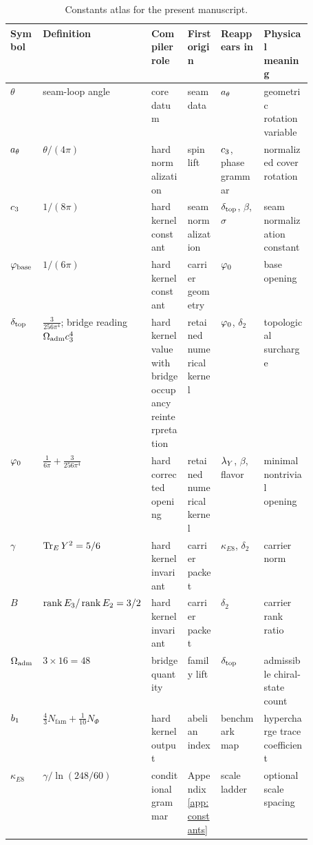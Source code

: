 \begin{table}[t]
\centering
\scriptsize
\setlength{\tabcolsep}{3pt}
\begin{tabularx}{\linewidth}{@{}>{\raggedright\arraybackslash}p{0.10\linewidth}>{\raggedright\arraybackslash}p{0.18\linewidth}>{\raggedright\arraybackslash}p{0.12\linewidth}>{\raggedright\arraybackslash}p{0.11\linewidth}YY@{}}
\toprule
Symbol & Definition & Compiler role & First origin & Reappears in & Physical meaning \\
\midrule
$\theta$ & seam-loop angle & core datum & seam data & $a_\theta$ & geometric rotation variable \\
$a_\theta$ & $\theta/(4\pi)$ & hard normalization & spin lift & $c_3$, phase grammar & normalized cover rotation \\
$c_3$ & $1/(8\pi)$ & hard kernel constant & seam normalization & $\delta_{\mathrm{top}}$, $\beta$, $\sigma$ & seam normalization constant \\
$\varphi_{\mathrm{base}}$ & $1/(6\pi)$ & hard kernel constant & carrier geometry & $\varphi_0$ & base opening \\
$\delta_{\mathrm{top}}$ & $\frac{3}{256\pi^4}$; bridge reading $\Omega_{\mathrm{adm}}c_3^4$ & hard kernel value with bridge occupancy reinterpretation & retained numerical kernel & $\varphi_0$, $\delta_2$ & topological surcharge \\
$\varphi_0$ & $\frac{1}{6\pi}+\frac{3}{256\pi^4}$ & hard corrected opening & retained numerical kernel & $\lambda_Y$, $\beta$, flavor & minimal nontrivial opening \\
$\gamma$ & $\operatorname{Tr}_EY^2=5/6$ & hard kernel invariant & carrier packet & $\kappa_{E8}$, $\delta_2$ & carrier norm \\
$B$ & $\operatorname{rank} E_3/\operatorname{rank} E_2=3/2$ & hard kernel invariant & carrier packet & $\delta_2$ & carrier rank ratio \\
$\Omega_{\mathrm{adm}}$ & $3\times16=48$ & bridge quantity & family lift & $\delta_{\mathrm{top}}$ & admissible chiral-state count \\
$b_1$ & $\frac43N_{\mathrm{fam}}+\frac1{10}N_\Phi$ & hard kernel output & abelian index & benchmark map & hypercharge trace coefficient \\
$\kappa_{E8}$ & $\gamma/\ln(248/60)$ & conditional grammar & Appendix~\ref{app:constants} & scale ladder & optional scale spacing \\
\bottomrule
\end{tabularx}
\caption{Constants atlas for the present manuscript.}
\label{tab:constants-atlas}
\end{table}

